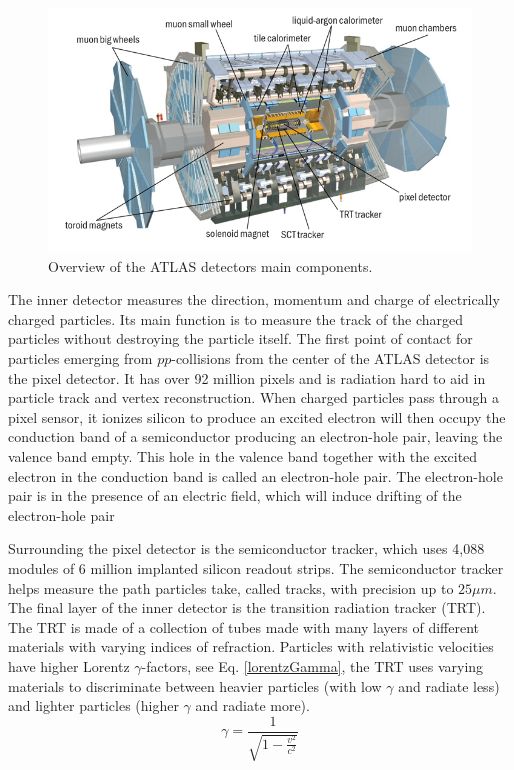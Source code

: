 \begin{figure}[h]
    \centering
    \includegraphics[width=.8\textwidth]{content/img/ATLAS_Detector.jpg}
    \caption{Overview of the ATLAS detectors main components. \cite{ATLAS_Illustration}}
    \label{fig:intro_ATLAS_detector}
\end{figure}


The inner detector measures the direction, momentum and charge of electrically charged particles.
Its main function is to measure the track of the charged particles without destroying the particle itself.
The first point of contact for particles emerging from $pp$-collisions from the center of the ATLAS detector is the pixel detector.\cite{PixelDetector_2008}
It has over 92 million pixels and is radiation hard to aid in particle track and vertex reconstruction.
When charged particles pass through a pixel sensor, it ionizes silicon to produce an excited electron will then occupy the conduction band of a semiconductor producing an electron-hole pair, leaving the valence band empty.\cite{KnollRadDetection}
This hole in the valence band together with the excited electron in the conduction band is called an electron-hole pair.
The electron-hole pair is in the presence of an electric field, which will induce drifting of the electron-hole pair 


Surrounding the pixel detector is the semiconductor tracker, which uses 4,088 modules of 6 million implanted silicon readout strips.\cite{ABDESSELAM2006642}
The semiconductor tracker helps measure the path particles take, called tracks, with precision up to $25\mu m$. 
The final layer of the inner detector is the transition radiation tracker (TRT). 
The TRT is made of a collection of tubes made with many layers of different materials with varying indices of refraction.  
Particles with relativistic velocities have higher Lorentz $\gamma$-factors, see Eq. \eqref{lorentzGamma}, the TRT uses varying materials to discriminate between heavier particles (with low $\gamma$ and radiate less) and lighter particles (higher $\gamma$ and radiate more). \cite{Mindur:2139567}
\begin{equation}\label{lorentzGamma}
    \gamma = \frac{1}{\sqrt{1 - \frac{v^2}{c^2}}}
\end{equation}

